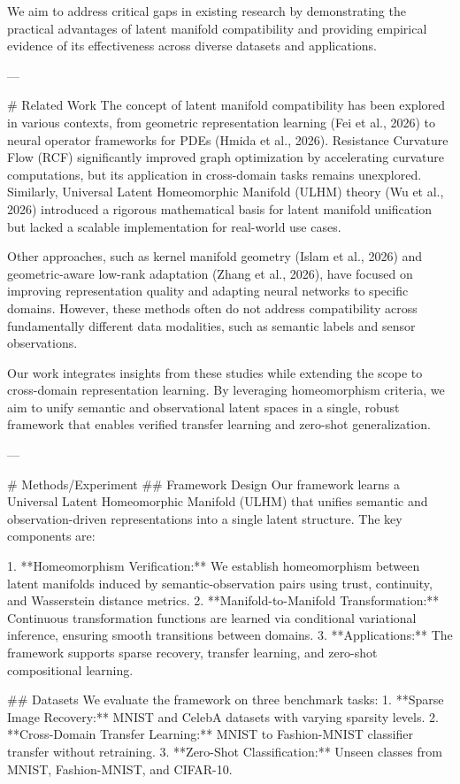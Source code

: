 We aim to address critical gaps in existing research by demonstrating the practical advantages of latent manifold compatibility and providing empirical evidence of its effectiveness across diverse datasets and applications.

---

# Related Work  
The concept of latent manifold compatibility has been explored in various contexts, from geometric representation learning (Fei et al., 2026) to neural operator frameworks for PDEs (Hmida et al., 2026). Resistance Curvature Flow (RCF) significantly improved graph optimization by accelerating curvature computations, but its application in cross-domain tasks remains unexplored. Similarly, Universal Latent Homeomorphic Manifold (ULHM) theory (Wu et al., 2026) introduced a rigorous mathematical basis for latent manifold unification but lacked a scalable implementation for real-world use cases.

Other approaches, such as kernel manifold geometry (Islam et al., 2026) and geometric-aware low-rank adaptation (Zhang et al., 2026), have focused on improving representation quality and adapting neural networks to specific domains. However, these methods often do not address compatibility across fundamentally different data modalities, such as semantic labels and sensor observations.

Our work integrates insights from these studies while extending the scope to cross-domain representation learning. By leveraging homeomorphism criteria, we aim to unify semantic and observational latent spaces in a single, robust framework that enables verified transfer learning and zero-shot generalization.

---

# Methods/Experiment  
## Framework Design  
Our framework learns a Universal Latent Homeomorphic Manifold (ULHM) that unifies semantic and observation-driven representations into a single latent structure. The key components are:

1. **Homeomorphism Verification:** We establish homeomorphism between latent manifolds induced by semantic-observation pairs using trust, continuity, and Wasserstein distance metrics.
2. **Manifold-to-Manifold Transformation:** Continuous transformation functions are learned via conditional variational inference, ensuring smooth transitions between domains.
3. **Applications:** The framework supports sparse recovery, transfer learning, and zero-shot compositional learning.

## Datasets  
We evaluate the framework on three benchmark tasks:
1. **Sparse Image Recovery:** MNIST and CelebA datasets with varying sparsity levels.
2. **Cross-Domain Transfer Learning:** MNIST to Fashion-MNIST classifier transfer without retraining.
3. **Zero-Shot Classification:** Unseen classes from MNIST, Fashion-MNIST, and CIFAR-10.

